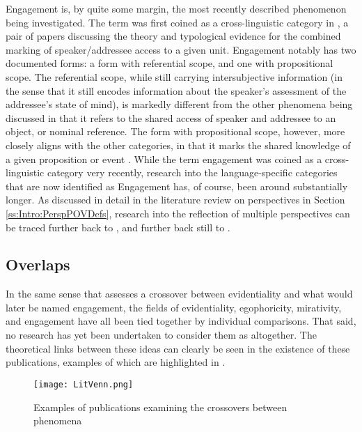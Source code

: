 Engagement is, by quite some margin, the most recently described phenomenon being investigated. The term was first coined as a cross-linguistic category in , a pair of papers discussing the theory and typological evidence for the combined marking of speaker/addressee access to a given unit. Engagement notably has two documented forms: a form with referential scope, and one with propositional scope. The referential scope, while still carrying intersubjective information (in the sense that it still encodes information about the speaker's assessment of the addressee's state of mind), is markedly different from the other phenomena being discussed in that it refers to the shared access of speaker and addressee to an object, or nominal reference. The form with propositional scope, however, more closely aligns with the other categories, in that it marks the shared knowledge of a given proposition or event \cite{EvansBergqvistSanRoque2018b}. While the term engagement was coined as a cross-linguistic category very recently, research into the language-specific categories that are now identified as Engagement has, of course, been around substantially longer. As discussed in detail in the literature review on perspectives in Section \ref{ss:Intro:PerspPOVDefs}, research into the reflection of multiple perspectives can be traced further back to , and further back still to .

\subsection{Overlaps}\label{ss:Intro:Overlaps}
In the same sense that  assesses a crossover between evidentiality and what would later be named engagement, the fields of evidentiality, egophoricity, mirativity, and engagement have all been tied together by individual comparisons. That said, no research has yet been undertaken to consider them as altogether.  The theoretical links between these ideas can clearly be seen in the existence of these publications, examples of which are highlighted in .
\nocite{Lau2017} \nocite{Hyslop2018} \nocite{Bergqvist2020} \nocite{Widmer2020}

\begin{figure}
    \centering
    \texttt{[image: LitVenn.png]}
    \caption{Examples of publications examining the crossovers between phenomena}
    \label{fig:LitVenn}
\end{figure}

